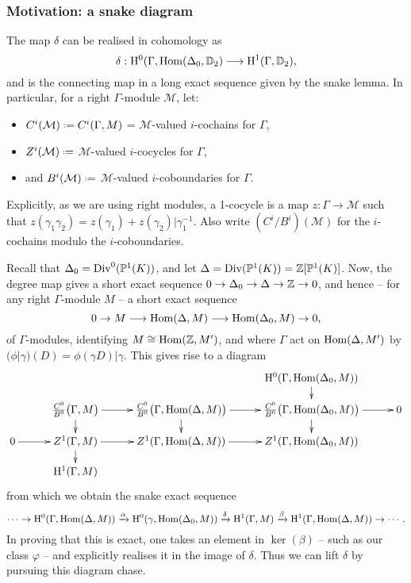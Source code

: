 \documentclass[a4paper,11pt]{article}
\numberwithin{equation}{section}
\begin{document}
\subsubsection{Motivation: a snake diagram}
The map $\delta$ can be realised in cohomology as
\[
\delta : \mathrm{H}^0(\Gamma,\mathrm{Hom}(\Delta_0,\mathbb{D}_2) \longrightarrow \mathrm{H}^1(\Gamma,\mathbb{D}_2),
\]
and is the connecting map in a long exact sequence given by the snake lemma. In particular, for a right $\Gamma$-module $\mathcal{M}$, let:
\begin{itemize}
	\item $C^i(\mathcal{M}) \defeq C^i(\Gamma,M)$ = $\mathcal{M}$-valued $i$-cochains for $\Gamma$,
	\item $Z^i(\mathcal{M}) \defeq$ $\mathcal{M}$-valued $i$-cocycles for $\Gamma$,
	\item and $B^i(\mathcal{M}) \defeq$ $\mathcal{M}$-valued $i$-coboundaries for $\Gamma$.
\end{itemize}
Explicitly, as we are using right modules, a 1-cocycle is a map $z : \Gamma \to \mathcal{M}$ such that $z(\gamma_1\gamma_2) = z(\gamma_1) + z(\gamma_2)|\gamma_1^{-1}$. Also write $(C^i/B^i)(\mathcal{M})$ for the $i$-cochains modulo the $i$-coboundaries.

Recall that $\Delta_0 = \mathrm{Div}^0(\mathbb{P}^1(K))$, and let $\Delta = \mathrm{Div}(\mathbb{P}^1(K)) = \mathbb{Z}[\mathbb{P}^1(K)]$. Now, the degree map gives a short exact sequence $0 \to \Delta_0 \to \Delta \to \mathbb{Z} \to 0$, and hence -- for any right $\Gamma$-module $M$ -- a short exact sequence
\[
	0 \to M \longrightarrow \mathrm{Hom}(\Delta,M) \longrightarrow \mathrm{Hom}(\Delta_0,M) \to 0,
\]
of $\Gamma$-modules, identifying $M \cong \mathrm{Hom}(\mathbb{Z},M')$, and where $\Gamma$ act on $\mathrm{Hom}(\Delta,M')$ by $(\phi|\gamma)(D) = \phi(\gamma D)|\gamma$. This gives rise to a diagram
\[
	\xymatrix@C=10mm@R=4mm{
		& & & \h^0(\Gamma,\Hom(\Delta_0,M))\ar[d] &\\
			 & \frac{C^0}{B^0}\big(\Gamma,M\big)\ar[r]\ar[d]   & \frac{C^0}{B^0}\big(\Gamma,\Hom(\Delta,M)\big)\ar[r]\ar[d] &  \frac{C^0}{B^0}\big(\Gamma,\Hom(\Delta_0,M)\big)\ar[r]\ar[d] &0\\
	0 \ar[r]  & Z^1(\Gamma,M)  \ar[r]\ar[d] & Z^1(\Gamma,\Hom(\Delta,M))  \ar[r] & Z^1(\Gamma,\Hom(\Delta_0,M)) &\\
	& \h^1(\Gamma,M) & & & \\
}
\]
from which we obtain the snake exact sequence
\[
\cdots \to \mathrm{H}^0(\Gamma,\mathrm{Hom}(\Delta,M)) \xrightarrow{\alpha} \mathrm{H}^0(\gamma,\mathrm{Hom}(\Delta_0,M)) \xrightarrow{\delta} \mathrm{H}^1(\Gamma,M) \xrightarrow{\beta} \mathrm{H}^1(\Gamma,\mathrm{Hom}(\Delta,M)) \to \cdots.
\]
In proving that this is exact, one takes an element in $\ker(\beta)$ -- such as our class $\varphi$ -- and explicitly realises it in the image of $\delta$. Thus we can lift $\delta$ by pursuing this diagram chase.
\end{document}
